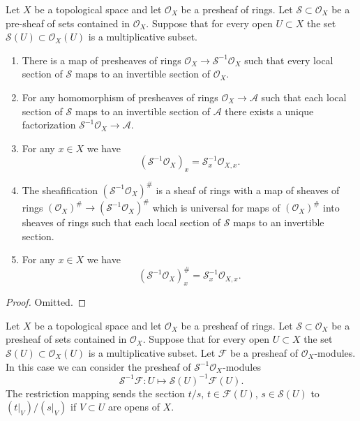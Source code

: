 \begin{lemma}
\label{lemma-simple-invert}
Let $X$ be a topological space and let $\mathcal{O}_X$ be a
presheaf of rings. Let $\mathcal{S} \subset \mathcal{O}_X$
be a pre-sheaf of sets contained in $\mathcal{O}_X$.
Suppose that for every open $U \subset X$ the set
$\mathcal{S}(U) \subset \mathcal{O}_X(U)$ is a multiplicative subset.
\begin{enumerate}
\item There is a map of presheaves of rings
$\mathcal{O}_X \to \mathcal{S}^{-1}\mathcal{O}_X$
such that every local section of $\mathcal{S}$ maps to an invertible
section of $\mathcal{O}_X$.
\item For any homomorphism of presheaves of rings
$\mathcal{O}_X \to \mathcal{A}$ such that each local section
of $\mathcal{S}$ maps to an invertible section of $\mathcal{A}$
there exists a unique factorization
$\mathcal{S}^{-1}\mathcal{O}_X \to \mathcal{A}$.
\item For any $x \in X$ we have
$$
(\mathcal{S}^{-1}\mathcal{O}_X)_x = \mathcal{S}_x^{-1} \mathcal{O}_{X, x}.
$$
\item The sheafification $(\mathcal{S}^{-1}\mathcal{O}_X)^\#$ is a sheaf
of rings with a map of sheaves of rings
$(\mathcal{O}_X)^\# \to (\mathcal{S}^{-1}\mathcal{O}_X)^\#$
which is universal for maps of $(\mathcal{O}_X)^\#$ into sheaves
of rings such that each local section of $\mathcal{S}$ maps
to an invertible section.
\item For any $x \in X$ we have
$$
(\mathcal{S}^{-1}\mathcal{O}_X)^\#_x = \mathcal{S}_x^{-1} \mathcal{O}_{X, x}.
$$
\end{enumerate}
\end{lemma}

\begin{proof}
Omitted.
\end{proof}

\noindent
Let $X$ be a topological space and let $\mathcal{O}_X$ be a
presheaf of rings. Let $\mathcal{S} \subset \mathcal{O}_X$
be a presheaf of sets contained in $\mathcal{O}_X$.
Suppose that for every open $U \subset X$ the set
$\mathcal{S}(U) \subset \mathcal{O}_X(U)$ is a multiplicative subset.
Let $\mathcal{F}$ be a presheaf of $\mathcal{O}_X$-modules.
In this case we can consider the presheaf of
$\mathcal{S}^{-1}\mathcal{O}_X$-modules
$$
\mathcal{S}^{-1}\mathcal{F} :
U \longmapsto \mathcal{S}(U)^{-1}\mathcal{F}(U).
$$
The restriction mapping sends the section $t/s$, $t \in \mathcal{F}(U)$,
$s \in \mathcal{S}(U)$ to $(t|_V)/(s|_V)$ if $V \subset U$ are opens
of $X$.

